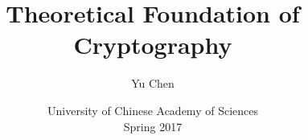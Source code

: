 \title[Theoretical Foundation of Cryptography] 
{
  Theoretical Foundation of Cryptography
}

\author[Yu Chen]{
    Yu Chen
}


\date[Spring, 2017]{University of Chinese Academy of Sciences\\
    Spring 2017
}